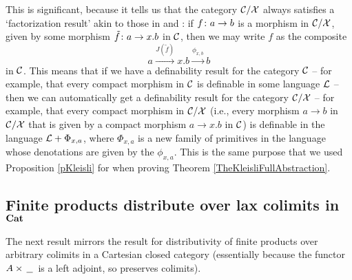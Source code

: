 \documentclass{article}
\begin{document}
This is significant, because it tells us that the category ${\mathcal{C}}/\mathcal X$ always satisfies a `factorization result' akin to those in \cite{SamsonGuyIAActive} and \cite{mcCHFiniteND}: if $f \colon a \to b$ is a morphism in ${\mathcal{C}}/\mathcal X$, given by some morphism $\tilde{f}\colon a \to x.b$ in ${\mathcal{C}}$, then we may write $f$ as the composite
\[
  a \xrightarrow{J(\tilde{f})} x.b \xrightarrow{\phi_{x,b}} b
  \]
in ${\mathcal{C}}$.  
This means that if we have a definability result for the category ${\mathcal{C}}$ -- for example, that every compact morphism in ${\mathcal{C}}$ is definable in some language $\mathcal L$ -- then we can automatically get a definability result for the category ${\mathcal{C}}/\mathcal X$ -- for example, that every compact morphism in ${\mathcal{C}}/\mathcal X$ (i.e., every morphism $a\to b$ in ${\mathcal{C}}/\mathcal X$ that is given by a compact morphism $a \to x.b$ in ${\mathcal{C}}$) is definable in the language $\mathcal L + \Phi_{x,a}$, where $\Phi_{x,a}$ is a new family of primitives in the language whose denotations are given by the $\phi_{x,a}$.
This is the same purpose that we used Proposition \ref{pKleisli} for when proving Theorem \ref{TheKleisliFullAbstraction}.

\subsection{Finite products distribute over lax colimits in ${\normalfont\textbf{Cat}}$}

The next result mirrors the result for distributivity of finite products over arbitrary colimits in a Cartesian closed category (essentially because the functor $A \times \,\underline{\hspace{1.5ex}}\,$ is a left adjoint, so preserves colimits).
\end{document}
